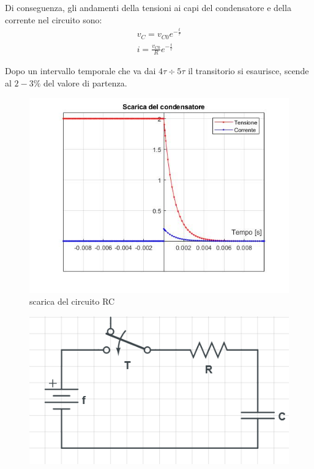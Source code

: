 \documentclass[a4paper, 12pt, twoside]{report}
\begin{document}
{Di conseguenza, gli andamenti della tensioni ai capi del condensatore e della corrente nel circuito sono: 
\begin{equation}
	\begin{split}
v_C=v_{C0}e^{-\frac{t}{\tau}}\\
i=\frac{v_{C0}}{R}e^{-\frac{t}{\tau}}
\end{split}
\end{equation}

Dopo un intervallo temporale che va dai $4\tau \div 5\tau$ il transitorio si esaurisce, scende al $2-3\%$ del valore di partenza. 

\begin{figure}[H]
	\centering
	\includegraphics[width=1\linewidth]{Carica&Scarica/plotScaricaRCfig}
	\caption{scarica del circuito RC}
	\label{fig:PLOTRC}
\end{figure}

\begin{figure}
	\includegraphics[width=1.0\linewidth]{Carica&Scarica/Carica RC}
\end{figure}

}
\end{document}

